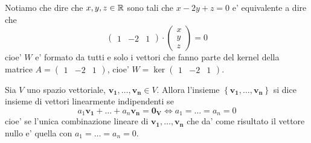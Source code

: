 \begin{example}
    Notiamo che dire che $x, y, z \in \mathbb{R}$ sono tali che $x-2y+z = 0$ e' equivalente a dire che \[
        \begin{pmatrix}
            1 &-2 &1
        \end{pmatrix} \cdot \begin{pmatrix}
            x \\ y \\ z
        \end{pmatrix} = 0
    \]
    cioe' $W$ e' formato da tutti e solo i vettori che fanno parte del kernel della matrice $A = \begin{pmatrix} 1 &-2 &1 \end{pmatrix}$, cioe' $W = \ker \begin{pmatrix} 1 &-2 &1 \end{pmatrix}$.
\end{example}

\begin{definition}
    Sia $V$ uno spazio vettoriale, $\bm{v_1}, \dots, \bm{v_n} \in V$. Allora l'insieme $\left\{ \bm{v_1}, \dots, \bm{v_n} \right\}$ si dice insieme di vettori linearmente indipendenti se
    \begin{equation}
        a_1\bm{v_1} + \dots + a_n\bm{v_n} = \bm{0_V} \iff a_1 = \dots = a_n = 0
    \end{equation}
    cioe' se l'unica combinazione lineare di $\bm{v_1}, \dots, \bm{v_n}$ che da' come risultato il vettore nullo e' quella con $a_1 = \dots = a_n = 0$.
\end{definition}

